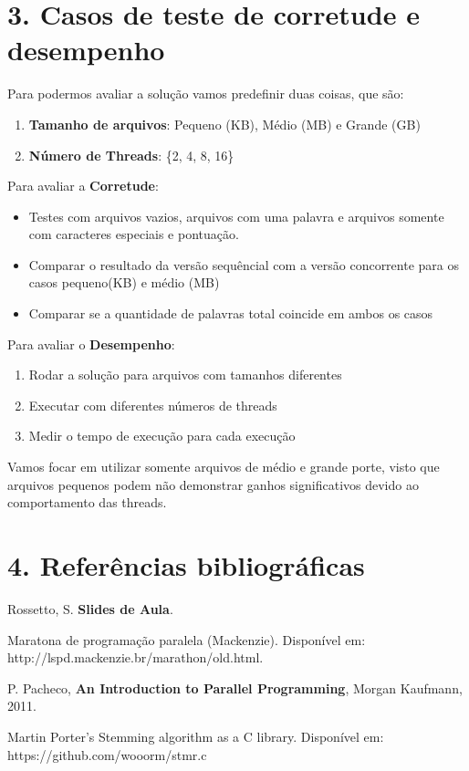 \documentclass{article}
\begin{document}
\section*{3. Casos de teste de corretude e desempenho}

Para podermos avaliar a solução vamos predefinir duas coisas, que são: 
\begin{enumerate}
    \item \textbf{Tamanho de arquivos}: Pequeno (KB), Médio (MB) e Grande (GB)
    \item \textbf{Número de Threads}: \{2, 4, 8, 16\}
\end{enumerate}

Para avaliar a \textbf{Corretude}:
\begin{itemize}
    \item Testes com arquivos vazios, arquivos com uma palavra e arquivos somente com caracteres especiais e pontuação.
    \item Comparar o resultado da versão sequêncial com a versão concorrente para os casos pequeno(KB) e médio (MB)
    \item Comparar se a quantidade de palavras total coincide em ambos os casos 
\end{itemize}

Para avaliar o \textbf{Desempenho}:
\begin{enumerate}
    \item Rodar a solução para arquivos com tamanhos diferentes
    \item Executar com diferentes números de threads
    \item Medir o tempo de execução para cada execução
\end{enumerate}
Vamos focar em utilizar somente arquivos de médio e grande porte, visto que arquivos pequenos podem não demonstrar ganhos significativos devido ao comportamento das threads.

\section*{4. Referências bibliográficas}
\begin{thebibliography}{9}
    Rossetto, S. \textbf{Slides de Aula}. 

    Maratona de programação paralela (Mackenzie). Disponível em: http://lspd.mackenzie.br/marathon/old.html. 

    P. Pacheco, \textbf{An Introduction to Parallel Programming}, Morgan Kaufmann, 2011.

    Martin Porter’s Stemming algorithm as a C library. Disponível em: https://github.com/wooorm/stmr.c

    
\end{thebibliography}
\end{document}
